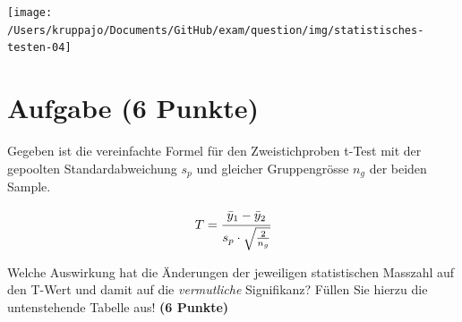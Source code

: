 \documentclass[a4paper, 10pt]{scrartcl}\usepackage[]{graphicx}\usepackage[]{xcolor}
\begin{document}
\begin{center}
  \texttt{[image: /Users/kruppajo/Documents/GitHub/exam/question/img/statistisches-testen-04]}
\end{center}


 
\clearpage

\section{Aufgabe \hfill (6 Punkte)}

Gegeben ist die vereinfachte Formel f{\"u}r den Zweistichproben t-Test mit der
gepoolten Standardabweichung $s_p$ und gleicher Gruppengr{\"o}sse $n_g$ der
beiden Sample.

\begin{equation*}
  \label{eq:1}
  T = \cfrac{\bar{y}_1 - \bar{y}_2}{s_p \cdot \sqrt{\tfrac{2}{n_g}}}
\end{equation*}

Welche Auswirkung hat die {\"A}nderungen der jeweiligen statistischen Masszahl
auf den T-Wert und damit auf die \textit{vermutliche} Signifikanz? F{\"u}llen
Sie hierzu die untenstehende Tabelle aus! \textbf{(6 Punkte)}
\end{document}
